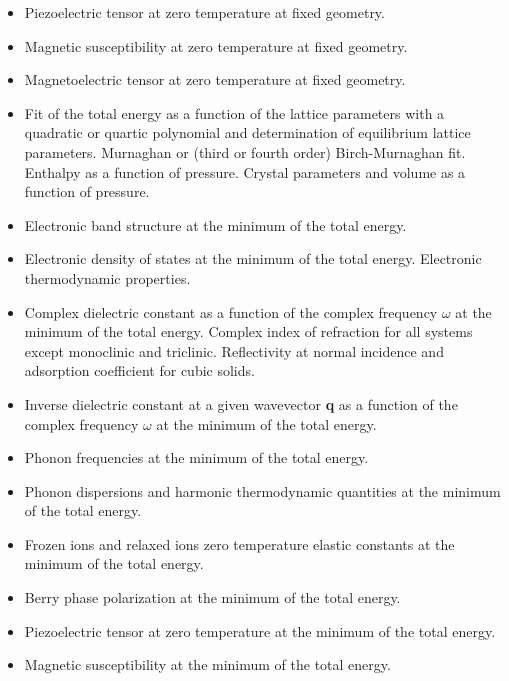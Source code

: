\documentclass[12pt,a4paper,twoside]{report}
\begin{document}
\begin{itemize}
\item Piezoelectric tensor at zero temperature at fixed geometry.

\item Magnetic susceptibility at zero temperature at fixed geometry.

\item Magnetoelectric tensor at zero temperature at fixed geometry.

\item Fit of the total energy as a function of the lattice parameters with
a quadratic or quartic polynomial and determination of equilibrium lattice 
parameters. Murnaghan or (third or fourth order) Birch-Murnaghan fit. 
Enthalpy as a function of pressure. Crystal
parameters and volume as a function of pressure. 

\item Electronic band structure at the minimum of the total energy.

\item Electronic density of states at the minimum of the total energy.
Electronic thermodynamic properties.  

\item Complex dielectric constant as a function of the complex
frequency $\omega$ at the minimum of the total energy. Complex index 
of refraction for all systems except monoclinic and triclinic. Reflectivity 
at normal incidence and adsorption coefficient for cubic solids.

\item Inverse dielectric constant at a given wavevector {\bf q} as a function 
of the complex frequency $\omega$ at the minimum of the total energy.

\item Phonon frequencies at the minimum of the total energy.

\item Phonon dispersions and harmonic thermodynamic quantities
at the minimum of the total energy.

\item Frozen ions and relaxed ions zero temperature elastic constants 
at the minimum of the total energy.

\item Berry phase polarization at the minimum of the total energy.

\item Piezoelectric tensor at zero temperature at the minimum of the
total energy.

\item Magnetic susceptibility at the minimum of the total energy.


\end{itemize}
\end{document}

